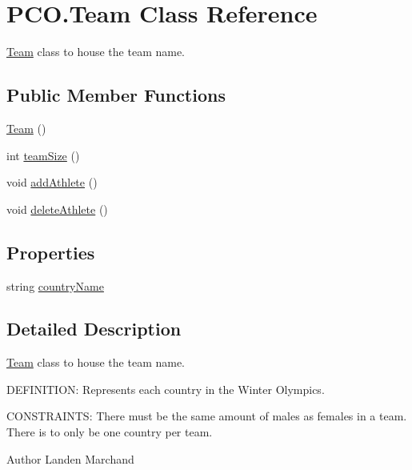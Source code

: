 \hypertarget{classPCO_1_1Team}{\section{P\+C\+O.\+Team Class Reference}
\label{classPCO_1_1Team}
}


\hyperlink{classPCO_1_1Team}{Team} class to house the team name.  


\subsection*{Public Member Functions}
\begin{DoxyCompactItemize}
\item 
\hyperlink{classPCO_1_1Team_a90aa98cc87012423a1ea29958ec92cbf}{Team} ()
\item 
int \hyperlink{classPCO_1_1Team_a6dcef9291a91023364896f67baec58ce}{team\+Size} ()
\item 
void \hyperlink{classPCO_1_1Team_a9ac920c7b0e54da02f45ead54118775a}{add\+Athlete} ()
\item 
void \hyperlink{classPCO_1_1Team_ae669fe9d1245c7a5a8a508924e5e499e}{delete\+Athlete} ()
\end{DoxyCompactItemize}
\subsection*{Properties}
\begin{DoxyCompactItemize}
\item 
string \hyperlink{classPCO_1_1Team_a1bcba510cc543dda5ce68b295e9ee26e}{country\+Name}
\end{DoxyCompactItemize}


\subsection{Detailed Description}
\hyperlink{classPCO_1_1Team}{Team} class to house the team name. 

D\+E\+F\+I\+N\+I\+T\+I\+O\+N\+: Represents each country in the Winter Olympics.

C\+O\+N\+S\+T\+R\+A\+I\+N\+T\+S\+: There must be the same amount of males as females in a team. There is to only be one country per team.\begin{DoxyAuthor}{Author}
Landen Marchand 
\end{DoxyAuthor}


